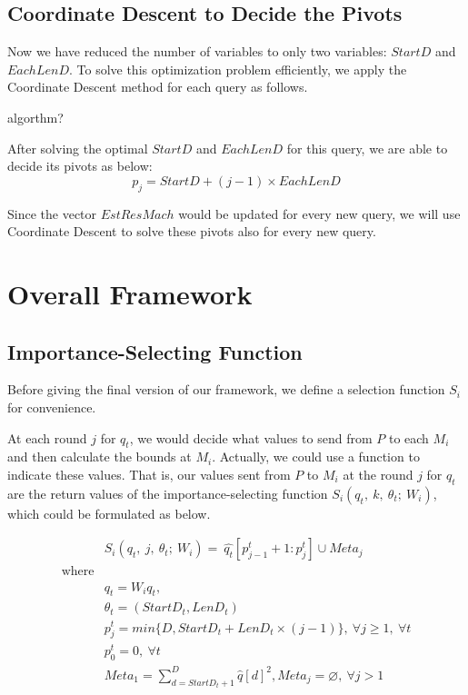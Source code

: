 
\subsection{Coordinate Descent to Decide the Pivots} %
\label{ss:coordinate_descent_to_decide_the_pivots}

Now we have reduced the number of variables to only two variables: $StartD$ and $EachLenD$. To solve this optimization problem efficiently, we apply the Coordinate Descent method for each query as follows.

algorthm?

After solving the optimal $StartD$ and $EachLenD$ for this query, we are able to decide its pivots as below:
\begin{equation}
	p_j = StartD + (j-1)\times EachLenD	
\end{equation}

Since the vector $EstResMach$ would be updated for every new query, we will use Coordinate Descent to solve these pivots also for every new query.



\section{Overall Framework} %
\label{s:overall_framework}
\subsection{Importance-Selecting Function} %
\label{ss:importance_selecting_function}

Before giving the final version of our framework, we define a selection function $S_i$ for convenience.  

At each round $j$ for $q_t$, we would decide what values to send from $P$ to each $M_i$ and then calculate the bounds at $M_i$. Actually, we could use a function to indicate these values.  That is, our values sent from $P$ to $M_i$ at the round $j$ for $q_t$ are the return values of the importance-selecting function $S_i(q_t,~k,~\theta_t;~W_i)$, which could be formulated as below.

\begin{equation}
\begin{aligned}
& S_i(q_t,~j,~\theta_t;~W_i) =~\hat{q_t}[p^t_{j-1}+1:p^t_j]\cup Meta_j \\
\text{where} \\
& \hat{q_t} = W_iq_t, \\
& \theta_t = (StartD_t, LenD_t) \\
& p^t_j = min\{ D, StartD_t + LenD_t\times (j-1) \},~\forall j\geq 1,~\forall t \\
& p^t_0 = 0,~\forall t\\
& Meta_1 = \sum^D_{d=StartD_t+1}{\hat{q}[d]^2}, Meta_j=\varnothing,~\forall j>1
\end{aligned}
\end{equation}

